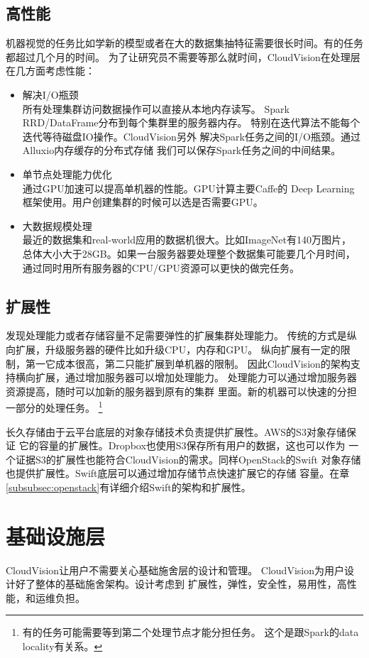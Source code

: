 \subsection{高性能}
机器视觉的任务比如学新的模型或者在大的数据集抽特征需要很长时间。有的任务都超过几个月的时间。
为了让研究员不需要等那么就时间，CloudVision在处理层在几方面考虑性能：
\begin{itemize}
  \item 解决I/O瓶颈 \\
        所有处理集群访问数据操作可以直接从本地内存读写。
        Spark RRD/DataFrame分布到每个集群里的服务器内存。
        特别在迭代算法不能每个迭代等待磁盘IO操作。CloudVision另外
        解决Spark任务之间的I/O瓶颈。通过Alluxio内存缓存的分布式存储
        我们可以保存Spark任务之间的中间结果。
  \item 单节点处理能力优化 \\
        通过GPU加速可以提高单机器的性能。GPU计算主要Caffe的
        Deep Learning框架使用。用户创建集群的时候可以选是否需要GPU。
  \item 大数据规模处理 \\
        最近的数据集和real-world应用的数据机很大。比如ImageNet有140万图片，
        总体大小大于28GB。如果一台服务器要处理整个数据集可能要几个月时间，
        通过同时用所有服务器的CPU/GPU资源可以更快的做完任务。
\end{itemize}

\subsection{扩展性}
发现处理能力或者存储容量不足需要弹性的扩展集群处理能力。
传统的方式是纵向扩展，升级服务器的硬件比如升级CPU，内存和GPU。
纵向扩展有一定的限制，第一它成本很高，第二只能扩展到单机器的限制。
因此CloudVision的架构支持横向扩展，通过增加服务器可以增加处理能力。
处理能力可以通过增加服务器资源提高，随时可以加新的服务器到原有的集群
里面。新的机器可以快速的分担一部分的处理任务。
\footnote{有的任务可能需要等到第二个处理节点才能分担任务。
这个是跟Spark的data locality有关系。}

长久存储由于云平台底层的对象存储技术负责提供扩展性。AWS的S3对象存储保证
它的容量的扩展性。Dropbox也使用S3保存所有用户的数据，这也可以作为
一个证据S3的扩展性也能符合CloudVision的需求。同样OpenStack的Swift
对象存储也提供扩展性。Swift底层可以通过增加存储节点快速扩展它的存储
容量。在章\ref{subsubsec:openstack}有详细介绍Swift的架构和扩展性。

\section{基础设施层}
\label{sec:arch_infra}
CloudVision让用户不需要关心基础施舍层的设计和管理。
CloudVision为用户设计好了整体的基础施舍架构。设计考虑到
扩展性，弹性，安全性，易用性，高性能，和运维负担。


